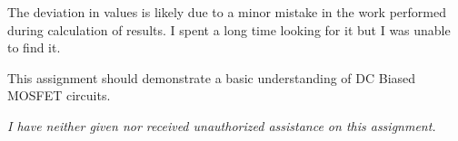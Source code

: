 \documentclass[12pt,letterpaper,titlepage]{article}
\begin{document}
\begin{raggedright}
\begin{center}
The deviation in values is likely due to a minor mistake in the work performed during calculation of results. I spent a long time looking for it but I was unable to find it. 
\end{center}

This assignment should demonstrate a basic understanding of DC Biased MOSFET circuits.

\textit{I have neither given nor received unauthorized assistance on this assignment.}


\end{raggedright}
\end{document}
